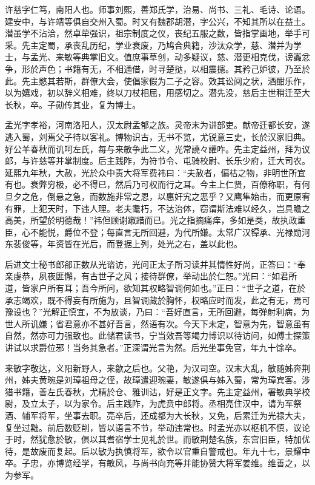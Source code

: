 \documentclass[12pt,UTF8]{ctexbook}
\begin{document}
许慈字仁笃，南阳人也。师事刘熙，善郑氏学，治易、尚书、三礼、毛诗、论语。建安中，与许靖等俱自交州入蜀。时又有魏郡胡潜，字公兴，不知其所以在益土。潜虽学不沾洽，然卓荦强识，祖宗制度之仪，丧纪五服之数，皆指掌画地，举手可采。先主定蜀，承丧乱历纪，学业衰废，乃鸠合典籍，沙汰众学，慈、潜并为学士，与孟光、来敏等典掌旧文。值庶事草创，动多疑议，慈、潜更相克伐，谤讟忿争，形於声色；书籍有无，不相通借，时寻楚挞，以相震攇。其矜己妒彼，乃至於此。先主愍其若斯，群僚大会，使倡家假为二子之容。效其讼阋之状，酒酣乐作，以为嬉戏，初以辞义相难，终以刀杖相屈，用感切之。潜先没，慈后主世稍迁至大长秋，卒。子勋传其业，复为博士。

孟光字孝裕，河南洛阳人，汉太尉孟郁之族。灵帝末为讲部吏。献帝迁都长安，遂逃入蜀，刘焉父子待以客礼。博物识古，无书不览，尤锐意三史，长於汉家旧典。好公羊春秋而讥呵左氏，每与来敏争此二义，光常譊々讙咋。先主定益州，拜为议郎，与许慈等并掌制度。后主践阼，为符节令、屯骑校尉、长乐少府，迁大司农。延熙九年秋，大赦，光於众中责大将军费祎曰：“夫赦者，偏枯之物，非明世所宜有也。衰弊穷极，必不得已，然后乃可权而行之耳。今主上仁贤，百僚称职，有何旦夕之危，倒悬之急，而数施非常之恩，以惠奸宄之恶乎？又鹰隼始击，而更原宥有罪，上犯天时，下违人理。老夫耄朽，不达治体，窃谓斯法难以经久，岂具瞻之高美，所望於明德哉！”祎但顾谢踧踖而已。光之指摘痛痒，多如是类，故执政重臣，心不能悦，爵位不登；每直言无所回避，为代所嫌。太常广汉镡承、光禄勋河东裴俊等，年资皆在光后，而登据上列，处光之右，盖以此也。

后进文士秘书郎郤正数从光谘访，光问正太子所习读并其情性好尚，正答曰：“奉亲虔恭，夙夜匪懈，有古世子之风；接待群僚，举动出於仁恕。”光曰：“如君所道，皆家户所有耳；吾今所问，欲知其权略智调何如也。”正曰：“世子之道，在於承志竭欢，既不得妄有所施为，且智调藏於胸怀，权略应时而发，此之有无，焉可豫设也？”光解正慎宜，不为放谈，乃曰：“吾好直言，无所回避，每弹射利病，为世人所讥嫌；省君意亦不甚好吾言，然语有次。今天下未定，智意为先，智意虽有自然，然亦可力强致也。此储君读书，宁当效吾等竭力博识以待访问，如傅士探策讲试以求爵位邪！当务其急者。”正深谓光言为然。后光坐事免官，年九十馀卒。

来敏字敬达，义阳新野人，来歙之后也。父艳，为汉司空。汉末大乱，敏随姊奔荆州，姊夫黄琬是刘璋祖母之侄，故璋遣迎琬妻，敏遂俱与姊入蜀，常为璋宾客。涉猎书籍，善左氏春秋，尤精於仓、雅训诂，好是正文字。先主定益州，署敏典学校尉，及立太子，以为家令。后主践阼，为虎贲中郎将。丞相亮住汉中，请为军祭酒、辅军将军，坐事去职。亮卒后，还成都为大长秋，又免，后累迁为光禄大夫，复坐过黜。前后数贬削，皆以语言不节，举动违常也。时孟光亦以枢机不慎，议论于时，然犹愈於敏，俱以其耆宿学士见礼於世。而敏荆楚名族，东宫旧臣，特加优待，是故废而复起。后以敏为执慎将军，欲令以官重自警戒也。年九十七，景耀中卒。子忠，亦博览经学，有敏风，与尚书向充等并能协赞大将军姜维。维善之，以为参军。
\end{document}

